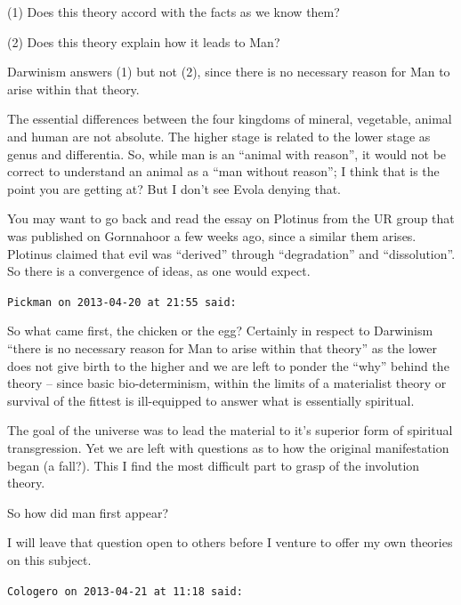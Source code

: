 \begin{footnotesize}
\begin{sffamily}
(1) Does this theory accord with the facts as we know them?

(2) Does this theory explain how it leads to Man?

Darwinism answers (1) but not (2), since there is no necessary reason for Man to arise within that theory.

The essential differences between the four kingdoms of mineral, vegetable, animal and human are not absolute. The higher stage is related to the lower stage as genus and differentia. So, while man is an ``animal with reason'', it would not be correct to understand an animal as a ``man without reason''; I think that is the point you are getting at? But I don't see Evola denying that.

You may want to go back and read the essay on Plotinus from the UR group that was published on Gornnahoor a few weeks ago, since a similar them arises. Plotinus claimed that evil was ``derived'' through ``degradation'' and ``dissolution''. So there is a convergence of ideas, as one would expect.

\hfill

\texttt{Pickman on 2013-04-20 at 21:55 said:}

So what came first, the chicken or the egg? Certainly in respect to Darwinism ``there is no necessary reason for Man to arise within that theory'' as the lower does not give birth to the higher and we are left to ponder the ``why'' behind the theory -- since basic bio-determinism, within the limits of a materialist theory or survival of the fittest is ill-equipped to answer what is essentially spiritual.

The goal of the universe was to lead the material to it's superior form of spiritual transgression. Yet we are left with questions as to how the original manifestation began (a fall?). This I find the most difficult part to grasp of the involution theory.

So how did man first appear?

I will leave that question open to others before I venture to offer my own theories on this subject.

\hfill

\texttt{Cologero on 2013-04-21 at 11:18 said:}


\end{sffamily}
\end{footnotesize}
